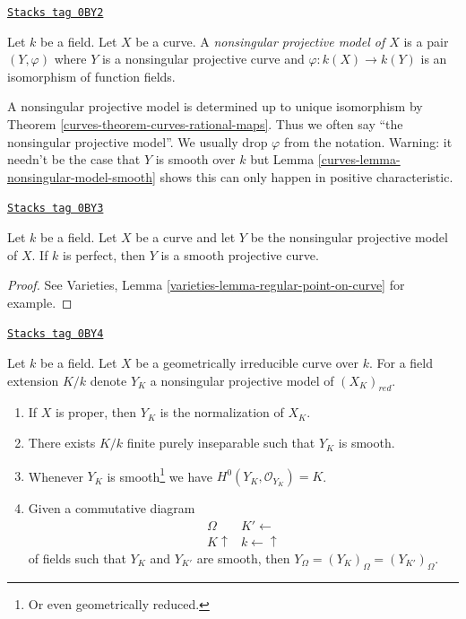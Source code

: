 \begin{definition}
\label{curves-definition-normal-projective-model}
\href{https://stacks.math.columbia.edu/tag/0BY2}{\texttt{Stacks tag 0BY2}}

Let $k$ be a field. Let $X$ be a curve.
A {\it nonsingular projective model of $X$}
is a pair $(Y, \varphi)$ where $Y$ is a nonsingular projective
curve and $\varphi : k(X) \to k(Y)$ is an isomorphism
of function fields.
\end{definition}

A nonsingular projective model is determined up to unique
isomorphism by Theorem \ref{curves-theorem-curves-rational-maps}.
Thus we often say ``the nonsingular projective model''.
We usually drop $\varphi$ from the notation.
Warning: it needn't be the case that $Y$ is smooth over $k$
but Lemma \ref{curves-lemma-nonsingular-model-smooth}
shows this can only happen in positive characteristic.

\begin{lemma}
\label{curves-lemma-nonsingular-model-smooth}
\href{https://stacks.math.columbia.edu/tag/0BY3}{\texttt{Stacks tag 0BY3}}

Let $k$ be a field. Let $X$ be a curve and let $Y$ be the nonsingular
projective model of $X$. If $k$ is perfect, then $Y$ is a smooth
projective curve.
\end{lemma}

\begin{proof}
See Varieties, Lemma \ref{varieties-lemma-regular-point-on-curve}
for example.
\end{proof}

\begin{lemma}
\label{curves-lemma-smooth-models}
\href{https://stacks.math.columbia.edu/tag/0BY4}{\texttt{Stacks tag 0BY4}}

Let $k$ be a field. Let $X$ be a geometrically irreducible curve over $k$.
For a field extension $K/k$ denote $Y_K$ a nonsingular projective model
of $(X_K)_{red}$.
\begin{enumerate}
\item If $X$ is proper, then $Y_K$ is the normalization of $X_K$.
\item There exists $K/k$ finite purely inseparable such that $Y_K$ is smooth.
\item Whenever $Y_K$ is smooth\footnote{Or even geometrically reduced.}
we have $H^0(Y_K, \mathcal{O}_{Y_K}) = K$.
\item Given a commutative diagram
$$
\begin{array}{cc}\Omega & K' \longleftarrow \\ K \uparrow & k \longleftarrow\uparrow\end{array}
$$
of fields such that $Y_K$ and $Y_{K'}$ are smooth, then
$Y_\Omega = (Y_K)_\Omega = (Y_{K'})_\Omega$.
\end{enumerate}
\end{lemma}

